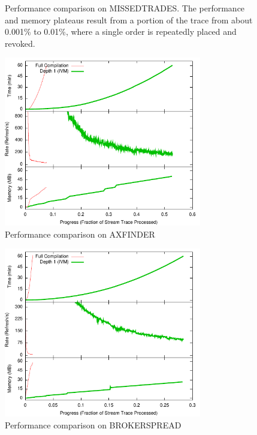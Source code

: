 \begin{figure}
\begin{center}
\caption{Performance comparison on MISSEDTRADES.  The performance and memory plateaus result from a portion of the trace from about 0.001\% to 0.01\%, where a single order is repeatedly placed and revoked.}
\label{fig:experiments:missedtrades}
\end{center}
\end{figure}


\begin{figure}
\begin{center}
\includegraphics[width=3.4in]{../graphs/graphs/unified_axfinder.pdf}
\caption{Performance comparison on AXFINDER}
\label{fig:experiments:axfinder}
\end{center}
\end{figure}

\begin{figure}
\begin{center}
\includegraphics[width=3.4in]{../graphs/graphs/unified_brokerspread.pdf}
\caption{Performance comparison on BROKERSPREAD}
\label{fig:experiments:brokerspread}
\end{center}
\end{figure}

